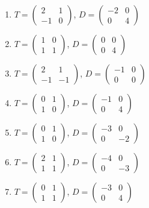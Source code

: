 \begin{enumerate}[label=\arabic*., leftmargin=*, itemsep=1pt]
\item $T=\left(\begin{smallmatrix}2 & 1\\ -1 & 0\end{smallmatrix}\right)$, $D=\left(\begin{smallmatrix}-2 & 0\\ 0 & 4\end{smallmatrix}\right)$
\item $T=\left(\begin{smallmatrix}1 & 0\\ 1 & 1\end{smallmatrix}\right)$, $D=\left(\begin{smallmatrix}0 & 0\\ 0 & 4\end{smallmatrix}\right)$
\item $T=\left(\begin{smallmatrix}2 & 1\\ -1 & -1\end{smallmatrix}\right)$, $D=\left(\begin{smallmatrix}-1 & 0\\ 0 & 0\end{smallmatrix}\right)$
\item $T=\left(\begin{smallmatrix}0 & 1\\ 1 & 0\end{smallmatrix}\right)$, $D=\left(\begin{smallmatrix}-1 & 0\\ 0 & 4\end{smallmatrix}\right)$
\item $T=\left(\begin{smallmatrix}0 & 1\\ 1 & 0\end{smallmatrix}\right)$, $D=\left(\begin{smallmatrix}-3 & 0\\ 0 & -2\end{smallmatrix}\right)$
\item $T=\left(\begin{smallmatrix}2 & 1\\ 1 & 1\end{smallmatrix}\right)$, $D=\left(\begin{smallmatrix}-4 & 0\\ 0 & -3\end{smallmatrix}\right)$
\item $T=\left(\begin{smallmatrix}0 & 1\\ 1 & 1\end{smallmatrix}\right)$, $D=\left(\begin{smallmatrix}-3 & 0\\ 0 & 4\end{smallmatrix}\right)$

\end{enumerate}

